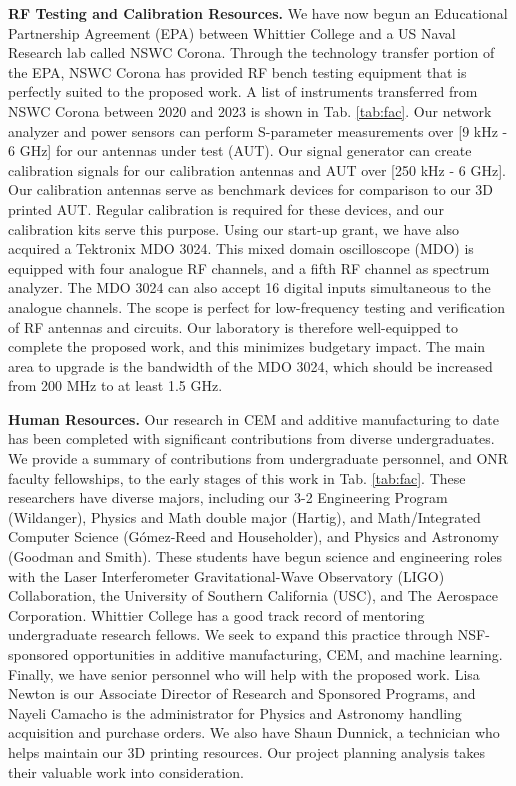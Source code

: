 \documentclass[../../main.tex]{subfiles}
\begin{document}
\textbf{RF Testing and Calibration Resources.}  We have now begun an Educational Partnership Agreement (EPA) between Whittier College and a US Naval Research lab called NSWC Corona.  Through the technology transfer portion of the EPA, NSWC Corona has provided RF bench testing equipment that is perfectly suited to the proposed work.  A list of instruments transferred from NSWC Corona between 2020 and 2023 is shown in Tab. \ref{tab:fac}.  Our network analyzer and power sensors can perform S-parameter measurements over [9 kHz - 6 GHz] for our antennas under test (AUT).  Our signal generator can create calibration signals for our calibration antennas and AUT over [250 kHz - 6 GHz].  Our calibration antennas serve as benchmark devices for comparison to our 3D printed AUT.  Regular calibration is required for these devices, and our calibration kits serve this purpose.  Using our start-up grant, we have also acquired a Tektronix MDO 3024.  This mixed domain oscilloscope (MDO) is equipped with four analogue RF channels, and a fifth RF channel as spectrum analyzer.  The MDO 3024 can also accept 16 digital inputs simultaneous to the analogue channels.  The scope is perfect for low-frequency testing and verification of RF antennas and circuits.  Our laboratory is therefore well-equipped to complete the proposed work, and this minimizes budgetary impact.  The main area to upgrade is the bandwidth of the MDO 3024, which should be increased from 200 MHz to at least 1.5 GHz.  \\ \vspace{2.5mm}

\textbf{Human Resources.} Our research in CEM and additive manufacturing to date has been completed with significant contributions from diverse undergraduates.  We provide a summary of contributions from undergraduate personnel, and ONR faculty fellowships, to the early stages of this work in Tab. \ref{tab:fac}.  These researchers have diverse majors, including our 3-2 Engineering Program (Wildanger), Physics and Math double major (Hartig), and Math/Integrated Computer Science (G\'{o}mez-Reed and Householder), and Physics and Astronomy (Goodman and Smith).   These students have begun science and engineering roles with the Laser Interferometer Gravitational-Wave Observatory (LIGO) Collaboration, the University of Southern California (USC), and The Aerospace Corporation.  Whittier College has a good track record of mentoring undergraduate research fellows.  We seek to expand this practice through NSF-sponsored opportunities in additive manufacturing, CEM, and machine learning.  Finally, we have senior personnel who will help with the proposed work.  Lisa Newton is our Associate Director of Research and Sponsored Programs, and Nayeli Camacho is the administrator for Physics and Astronomy handling acquisition and purchase orders.  We also have Shaun Dunnick, a technician who helps maintain our 3D printing resources.  Our project planning analysis takes their valuable work into consideration. \\ \vspace{2.5mm}
\end{document}

